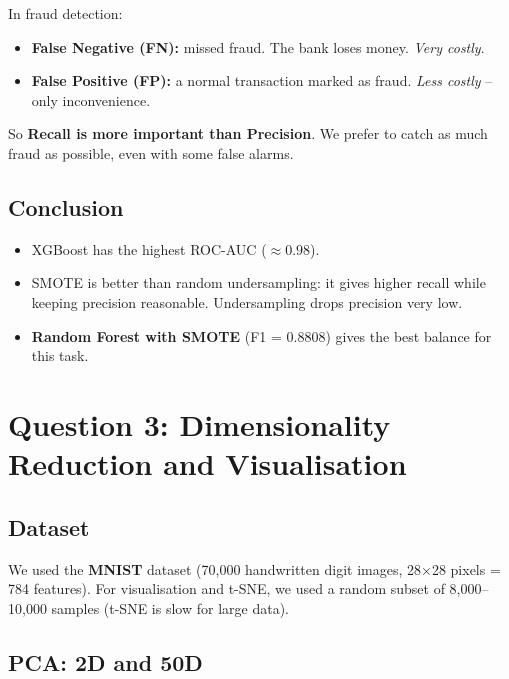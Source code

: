 \documentclass[11pt,a4paper]{article}
\begin{document}
In fraud detection:
\begin{itemize}
    \item \textbf{False Negative (FN):} missed fraud. The bank loses money. \emph{Very costly}.
    \item \textbf{False Positive (FP):} a normal transaction marked as fraud. \emph{Less costly} -- only inconvenience.
\end{itemize}

So \textbf{Recall is more important than Precision}. We prefer to catch as much fraud as possible, even with some false alarms.

\subsection{Conclusion}

\begin{itemize}
    \item XGBoost has the highest ROC-AUC ($\approx 0.98$).
    \item SMOTE is better than random undersampling: it gives higher recall while keeping precision reasonable. Undersampling drops precision very low.
    \item \textbf{Random Forest with SMOTE} (F1 = 0.8808) gives the best balance for this task.
\end{itemize}

\newpage

\section{Question 3: Dimensionality Reduction and Visualisation}

\subsection{Dataset}

We used the \textbf{MNIST} dataset (70{,}000 handwritten digit images, 28$\times$28 pixels = 784 features).
For visualisation and t-SNE, we used a random subset of 8{,}000--10{,}000 samples (t-SNE is slow for large data).

\subsection{PCA: 2D and 50D}
\end{document}
